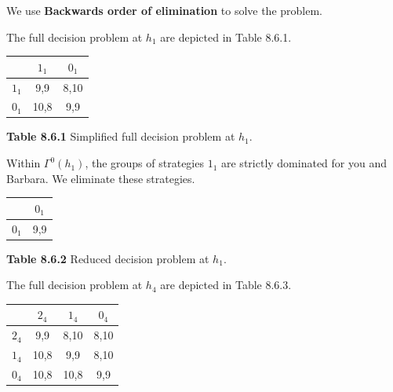 \documentclass{article}
\begin{document}
\begin{description}
    We use {\bf Backwards order of elimination} to solve the problem.

    The full decision problem at $h_1$ are depicted in Table 8.6.1.
    \begin{center}
        \begin{tabular}{ccc}
        \hline
        \hline
                   &          $1_1$ &          $0_1$ \\
        \hline
                 $1_1$ &        9,9 &       8,10 \\

                 $0_1$ &       10,8 &        9,9 \\
        \hline
        \end{tabular}

        {\bf Table 8.6.1} Simplified full decision problem at $h_1$.
    \end{center}
     Within $\Gamma ^0\left(h_1\right)$, the groups of strategies $1_1$ are strictly dominated for you and Barbara. We eliminate these strategies.
    \begin{center}
        \begin{tabular}{cc}
        \hline
        \hline
                   &          $0_1$ \\
        \hline
                 $0_1$ &        9,9 \\
        \hline
        \end{tabular}

        {\bf Table 8.6.2} Reduced decision problem at $h_1$.
    \end{center}



    The full decision problem at $h_4$ are depicted in Table 8.6.3.
    \begin{center}
        \begin{tabular}{cccc}
        \hline
        \hline
                   &          $2_4$ &          $1_4$&          $0_4$ \\
        \hline
                 $2_4$ &        9,9 &       8,10 &       8,10 \\

                 $1_4$ &       10,8 &        9,9 &       8,10 \\

                 $0_4$ &       10,8 &       10,8 &        9,9 \\
        \hline
        \end{tabular}


\end{center}
\end{description}
\end{document}
